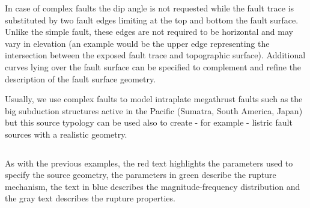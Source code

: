 In case of complex faults the dip angle is not requested while the fault trace
is substituted by two fault edges limiting at the top and bottom the fault
surface. Unlike the simple fault, these edges are not required to be horizontal
and may vary in elevation (an example would be the upper edge representing the
intersection between the exposed fault trace and topographic surface). Additional
curves lying over the fault surface can be specified to complement and refine
the description of the fault surface geometry.

Usually, we use complex faults to model intraplate megathrust faults such as
the big subduction structures active in the Pacific (Sumatra, South America,
Japan) but this source typology can be used also to create - for example -
listric fault sources with a realistic geometry.

\inputminted[firstline=1,firstnumber=1,fontsize=\footnotesize,frame=single,linenos,bgcolor=lightgray]{xml}{oqum/hazard/verbatim/input_complex_fault.xml}

%

As with the previous examples, the red text highlights the parameters used to
specify the source geometry, the parameters in green describe the rupture
mechanism, the text in blue describes the magnitude-frequency distribution and
the gray text describes the rupture properties.
